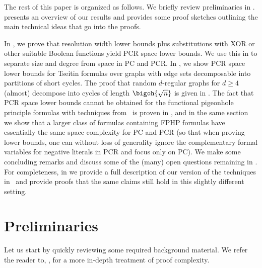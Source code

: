 \documentclass{toc}
\begin{document}
%


  The rest of this paper is organized as follows.
  We briefly review preliminaries in
 .
   presents an overview of
  our results and provides some proof sketches outlining the main
  technical ideas that go into the proofs.
%

  In
 ,
  we prove that resolution width lower bounds plus substitutions with
  XOR or other suitable Boolean functions yield PCR space lower bounds.
  We use this in 
  to separate size and degree from space in PC and PCR.
  In
 ,
  we show PCR space lower bounds for Tseitin formulas over graphs
  with edge sets decomposable into partitions of %
  short  %
  cycles.
  The proof that random \mbox{$d$-regular} graphs for $d \geq 4$ (almost)
  decompose into cycles of length $\bigoh{\sqrt{n}}$ is given in
 .
  The fact that PCR space lower bounds cannot be obtained for the
  functional pigeonhole principle formulas with techniques from~\cite{BG15Framework} is
  proven in
 ,
  and in the same section 
  we show that a larger class of formulas containing FPHP formulas
  have essentially the same space complexity for PC and PCR
  (so that when proving lower bounds, one can without loss of
  generality ignore the complementary formal variables for negative literals
  in PCR and focus only on PC).
%
%
%
  We make some concluding remarks and discuss some of the
  (many) open questions remaining in 
 .  %
  For completeness, 
  in
  we provide a full description of our version of
  the techniques in~\cite{BG15Framework}
  and provide proofs that the same claims  still hold in this slightly
  different setting. 
 
%
\section{Preliminaries}
\label{sec:preliminaries}

Let us start by quickly reviewing some required background material. 
We refer the reader to, 
%
%
\eg,      %
\cite{BN21ProofCplxSAT,Krajicek19ProofComplexity}
for a more in-depth treatment of proof complexity.
\end{document}
